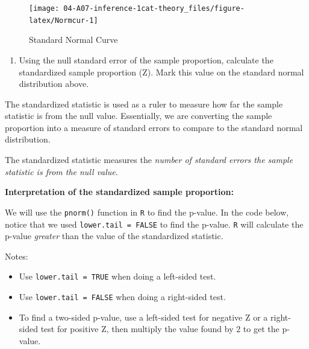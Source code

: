 \documentclass[
]{report}
\providecommand{\tightlist}{%
  \setlength{\itemsep}{0pt}\setlength{\parskip}{0pt}}
\begin{document}
\vspace{2mm}

\begin{figure}

{\centering \texttt{[image: 04-A07-inference-1cat-theory\_files/figure-latex/Normcur-1]} 

}

\caption{Standard Normal Curve}\label{fig:Normcur}
\end{figure}

\begin{enumerate}
\def\labelenumi{\arabic{enumi}.}
\setcounter{enumi}{5}
\tightlist
\item
  Using the null standard error of the sample proportion, calculate the standardized sample proportion (Z). Mark this value on the standard normal distribution above.
\end{enumerate}

\vspace{0.6in}

The standardized statistic is used as a ruler to measure how far the sample statistic is from the null value. Essentially, we are converting the sample proportion into a measure of standard errors to compare to the standard normal distribution.

The standardized statistic measures the \emph{number of standard errors the sample statistic is from the null value}.

\textbf{Interpretation of the standardized sample proportion:}

\vspace{.8in}

We will use the \texttt{pnorm()} function in \texttt{R} to find the p-value. In the code below, notice that we used \texttt{lower.tail\ =\ FALSE} to find the p-value. \texttt{R} will calculate the p-value \emph{greater} than the value of the standardized statistic.

Notes:

\begin{itemize}
\tightlist
\item
  Use \texttt{lower.tail\ =\ TRUE} when doing a left-sided test.
\item
  Use \texttt{lower.tail\ =\ FALSE} when doing a right-sided test.
\item
  To find a two-sided p-value, use a left-sided test for negative Z or a right-sided test for positive Z, then multiply the value found by 2 to get the p-value.
\end{itemize}
\end{document}
